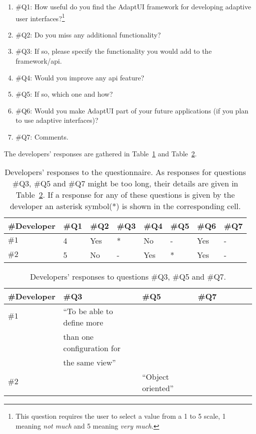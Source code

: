 \begin{enumerate}
 \item \#Q1: How useful do you find the AdaptUI framework for developing adaptive 
 user interfaces?\footnote{This question requires the user to select a value from
 a 1 to 5 scale, 1 meaning \textit{not much} and 5 meaning \textit{very much}.}
 \item \#Q2: Do you miss any additional functionality?
 \item \#Q3: If so, please specify the functionality you would add to the 
 framework/\ac{api}.
 \item \#Q4: Would you improve any \ac{api} feature?
 \item \#Q5: If so, which one and how?
 \item \#Q6: Would you make AdaptUI part of your future applications (if you 
 plan to use adaptive interfaces)?
 \item \#Q7: Comments.
\end{enumerate}

The developers' responses are gathered in Table~\ref{tbl:developers_responses}
and Table~\ref{tbl:developers_responses_2}.

\begin{table}
  \caption{Developers' responses to the questionnaire. As responses for questions 
  \#Q3, \#Q5 and \#Q7 might be too long, their details are given in 
  Table~\ref{tbl:developers_responses_2}. If a response for any of these questions
  is given by the developer an asterisk symbol(*) is shown in the corresponding
  cell.}
 \label{tbl:developers_responses}
\footnotesize
\centering
 \begin{tabular}{l l l l l l l l}
  \hline 
  \textbf{\#Developer} 	& \textbf{\#Q1} & \textbf{\#Q2} & \textbf{\#Q3} & \textbf{\#Q4} & \textbf{\#Q5} & \textbf{\#Q6} & \textbf{\#Q7} \\
  \hline
  $\#1$			& 4		& Yes		& * 		& No	 	& - 	& Yes 		& - \\
  $\#2$			& 5		& No		& - 		& Yes		& *	& Yes		& - \\
  \hline
\end{tabular}
\end{table}

\begin{table}
  \caption{Developers' responses to questions \#Q3, \#Q5 and \#Q7.}
 \label{tbl:developers_responses_2}
\footnotesize
\centering
 \begin{tabular}{l l l l l l l l}
  \hline 
  \textbf{\#Developer} 	& \textbf{\#Q3} 		& \textbf{\#Q5} 	& \textbf{\#Q7}	\\
  \hline
  $\#1$			& ``To be able to define more	& 			& 		\\
			& than one configuration for 	& 			& 		\\
			& the same view''		& 			& 		\\
  $\#2$			& 				& ``Object oriented''	& 		\\
  \hline
\end{tabular}
\end{table}
